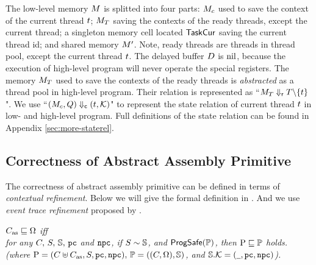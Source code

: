 The low-level memory $M$ is splitted into four parts: 
$M_c$ used to save the context of the current thread $t$; 
$M_T$ saving the contexts of the ready threads, 
except the current thread; a singleton memory 
cell located $\mathsf{TaskCur}$ saving the current thread id; and shared 
memory $M'$. Note, ready threads are threads in thread pool, 
except the current thread $t$. The delayed buffer $D$ is 
$\text{nil}$, because the execution of high-level program will never operate 
the special registers. The memory $M_T$ used to 
save the contexts of the ready threads is {\it abstracted} as a thread pool 
in high-level program. Their relation is represented as 
``${M_T} \Downarrow_{\textsf{r}} {T \backslash \{ t \}}$".  
We use ``${(M_c, Q)} \Downarrow_{\textsf{c}} {(t, \mathcal{K})}$" 
to represent the state relation of current thread $t$ 
in low- and high-level program. Full definitions of the state relation 
can be found in Appendix \ref{sec:more-staterel}. 

\subsection{Correctness of Abstract Assembly Primitive}
\label{subsec:correctness-primitive}

The correctness of abstract assembly primitive can be defined in terms of  
{\it contextual refinement}.  
Below we will give the formal definition in 
\Def{\ref{def:prim-correctness}}.  
And we use {\it event trace refinement} 
proposed by  \cite{liang14lics}.

\begin{definition}
    \em
    \label{def:prim-correctness}
    $C_{\text{as}} \sqsubseteq \Omega$ iff  \\
    for any $C, \, S, \, \mathbb{S}, \, \texttt{pc}$ and $\texttt{npc}$, if 
    ${S} \sim {\mathbb{S}}$, and $\textsf{ProgSafe}(\mathbb{P})$, 
    then $\text{P} \sqsubseteq \mathbb{P}$ holds. 
    (where $\text{P} = (C \uplus C_{\text{as}}, S, \texttt{pc}, \texttt{npc}), \, 
        \mathbb{P} = ((C, \Omega), \mathbb{S})$, and 
        $\mathbb{S}.\mathcal{K} = (\underline{\ \,}, \texttt{pc}, \texttt{npc})$).  
\end{definition}

